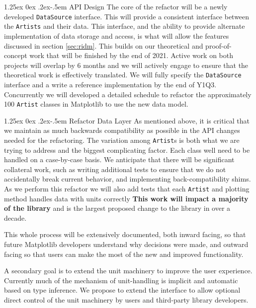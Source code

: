 \documentclass[12pt]{article}
\makeatletter
\numberwithin{page}{section}
\renewcommand{\paragraph}{%
  \@startsection{paragraph}{4}%
  {\z@}{1.25ex \@plus 0ex \@minus .2ex}{-.5em}%
  {\normalfont\normalsize\itshape\bfseries}%
}
\makeatother
\begin{document}
\paragraph{API Design} The core of the refactor will be a newly developed \texttt{DataSource}
interface.  This will provide a consistent interface between the
\texttt{Artists} and their data.  This interface, and the ability to
provide alternate implementation of data storage and access, is what
will allow the features discussed in section \ref{sec:ridm}.  This builds on our
theoretical and proof-of-concept work that will be finished by the end of
2021.  Active work on both projects will overlap by 6 months and we
will actively engage to ensure that the theoretical work is
effectively translated.  We will fully specify the \texttt{DataSource}
interface and a write a reference implementation by the end of Y1Q3.
Concurrently we will developed a detailed schedule to refactor the
approximately 100 \texttt{Artist} classes in Matplotlib to use the new
data model.

\paragraph{Refactor Data Layer} As mentioned above, it is critical that we maintain as much backwards
compatibility as possible in the API changes needed for the refactoring.  The variation
among \texttt{Artist}s is both what we are trying to address and the
biggest complicating factor.  Each class well need to be handled on a
case-by-case basis.  We anticipate that there will be significant
collateral work, such as writing additional tests to ensure that we do
not accidentally break current behavior, and implementing
back-compatibility shims.  As we
perform this refactor we will also add tests that each \texttt{Artist}
and plotting method handles data with units correctly
\textbf{This work will impact a majority of the library} and is the
largest proposed change to the library in over a decade.

This whole process will be extensively documented, both inward facing,
so that future Matplotlib developers understand why decisions were
made, and outward facing so that users can make the most of the new
and improved functionality.



A secondary goal is to extend the unit machinery to improve the user
experience.  Currently much of the mechanism of unit-handling is
implicit and automatic based on type inference.  We propose to extend
the interface to allow optional direct control of the unit machinery
by users and third-party library developers.
\end{document}
